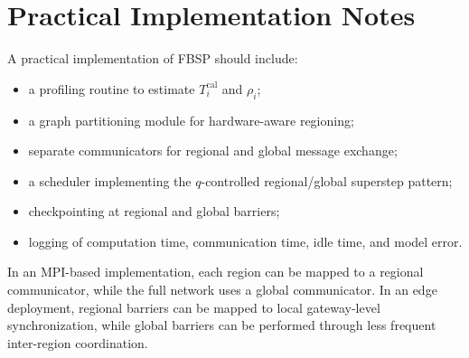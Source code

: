 ﻿\documentclass[10pt,journal]{IEEEtran}
\begin{document}
	\section{Practical Implementation Notes}
	
	A practical implementation of FBSP should include:
	
	\begin{itemize}
		\item a profiling routine to estimate $T_i^{\mathrm{cal}}$ and $\rho_i$;
		\item a graph partitioning module for hardware-aware regioning;
		\item separate communicators for regional and global message exchange;
		\item a scheduler implementing the $q$-controlled regional/global superstep pattern;
		\item checkpointing at regional and global barriers;
		\item logging of computation time, communication time, idle time, and model error.
	\end{itemize}
	
	In an MPI-based implementation, each region can be mapped to a regional communicator, while the full network uses a global communicator. In an edge deployment, regional barriers can be mapped to local gateway-level synchronization, while global barriers can be performed through less frequent inter-region coordination.
	
\end{document}
